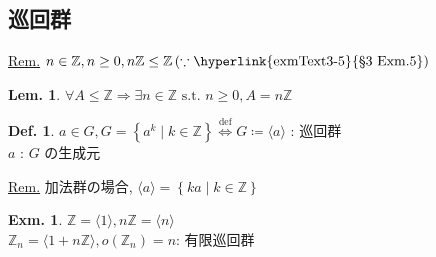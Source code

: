 \documentclass[uplatex,dvipdfmx,9pt]{beamer}
\newcommand{\defarrow}{\overset{\mathrm{def}}{\Leftrightarrow}}
\newcommand{\st}{\text{ s.t. }}
\newcounter{textLemCount}
\newcounter{textExmCount}
\theoremstyle{definition} %
\newtheorem{defn}{Def.}[subsection] %
\newtheorem{lemText}[textLemCount]{Lem.} %
\theoremstyle{example}
\newtheorem{exm}{Exm.}[subsection]
\begin{document}
    \subsection{\textsection \thesubsection 巡回群}
    \setcounter{textExmCount}{0}

      \begin{frame}
        \underline{Rem.} $n \in \mathbb{Z}, n \ge 0, n\mathbb{Z} \le \mathbb{Z} \left( \because \text{\hyperlink{exmText3-5}{\textsection3 Exm.5}} \right)$
        
        \begin{lemText}
          $\forall A \le \mathbb{Z} \Rightarrow \exists n \in \mathbb{Z} \st n \ge 0, A = n\mathbb{Z}$ 
        \end{lemText}

        \begin{defn}
          $a \in G, G = \left\{ a^k \mid k \in \mathbb{Z} \right\} \defarrow G \coloneqq \langle a \rangle$ : \alert{巡回群} \\
          $a$ : $G$ の\alert{生成元}
        \end{defn}
        \underline{Rem.} 加法群の場合, $\langle a \rangle = \left\{ ka \mid k \in \mathbb{Z} \right\}$

        \begin{exm}
          $\mathbb{Z} = \langle 1 \rangle, n\mathbb{Z} = \langle n \rangle$ \\
          $\mathbb{Z}_n = \langle 1 + n\mathbb{Z} \rangle, o(\mathbb{Z}_n) = n$: 有限巡回群 
        \end{exm}

      \end{frame}
\end{document}
